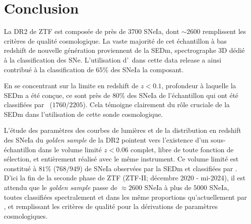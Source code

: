 \documentclass[../main/main.tex]{subfiles}
\begin{document}
\clearpage
\section{Conclusion}

La DR2 de ZTF est composée de près de $3700$ SNeIa, dont $\sim2600$
remplissent les critères de qualité cosmologique. La vaste majorité de
cet échantillon à bas redshift de nouvelle génération proviennent de la
SEDm, spectrographe 3D dédié à la classification des SNe. L'utilisation
d'\hypergal\ dans cette data release a ainsi contribué à la
classification de $65\%$ des SNeIa la composant.

En se concentrant sur la limite en redshift de $z<0.1$, profondeur à
laquelle la SEDm a été conçue, ce sont près de $80\%$ des SNeIa de l'échantillon
qui ont été classifiées par \hypergal\ ($1760/2205$). Cela témoigne clairement du rôle
cruciale de la SEDm dans l'utilisation de cette sonde cosmologique.

L'étude des paramètres des courbes de lumières et de la distribution en
redshift des SNeIa du \textit{golden sample} de la DR2 pointent vers
l'existence d'un sous-échantillon dans le volume limité $z<0.06$
complet, libre de toute fonction de sélection, et entièrement réalisé
avec le même instrument. Ce volume limité est constitué à $81\%$
($768/949$) de SNeIa observées par la SEDm et classifiées par
\hypergal.
D'ici la fin de la seconde phase de ZTF (ZTF-II; décembre 2020 -
mi-2024), il est attendu que le \textit{golden sample} passe de
$\approx2600$ SNeIa à plus de $5000$ SNeIa, toutes classifiées
spectralement et dans les même proportions qu'actuellement par \hypergal, et
remplissant les critères de qualité pour la dérivations de paramètres cosmologiques.






%
%
\end{document}
